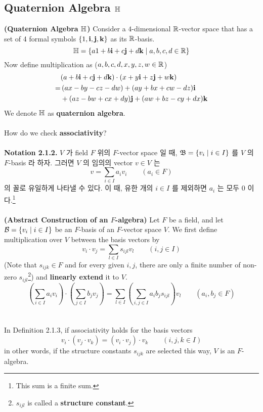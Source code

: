 \subsection{Quaternion Algebra $\mathbb{H}$}
 \textbf{(Quaternion Algebra $\mathbb{H}$)} Consider a $4$-dimensional $\mathbb{R}$-vector space that has a set of 4 formal symbols $\{1, \mathrm{\mathbf{i}}, \mathrm{\mathbf{j}}, \mathrm{\mathbf{k}}\}$ as its $\mathbb{R}$-basis.
$$\mathbb{H} = \{a1+b\mathrm{\mathbf{i}}+c\mathrm{\mathbf{j}} + d\mathrm{\mathbf{k}} \mid a, b, c, d\in \mathbb{R}\}$$
Now define multiplication as ($a, b, c, d, x, y, z, w\in \mathbb{R}$)
$$\begin{aligned}
&(a+b\mathrm{\mathbf{i}}+c\mathrm{\mathbf{j}}+d\mathrm{\mathbf{k}})\cdot(x+y\mathrm{\mathbf{i}}+z\mathrm{\mathbf{j}}+w\mathrm{\mathbf{k}}) \\=&\,(ax-by-cz-dw) + (ay+bx+cw-dz)\mathrm{\mathbf{i}}\\&+(az-bw+cx+dy)\mathrm{\mathbf{j}} + (aw+bz-cy+dx)\mathrm{\mathbf{k}}
\end{aligned}$$
We denote $\mathbb{H}$ as \textbf{quaternion algebra}.\\
\\
How do we check \textbf{associativity}?\\
\\
\textbf{\sffamily Notation 2.1.2.} $V$ 가 field $F$ 위의 $F$-vector space 일 때, $\mathfrak{B} = \{v_i \mid i\in I\}$ 를 $V$ 의 $F$-basis 라 하자. 그러면 $V$ 의 임의의 vector $v\in V$ 는
$$v = \sum_{i\in I} a_i v_i \qquad (a_i\in F)$$
의 꼴로 유일하게 나타낼 수 있다. 이 때, 유한 개의 $i\in I$ 를 제외하면 $a_i$ 는 모두 0 이다.\footnote{This sum is a finite sum.}\\
\\
 \textbf{(Abstract Construction of an $F$-algebra)} Let $F$ be a field, and let $\mathcal{B} = \{v_i\mid i\in I\}$ be an $F$-basis of an $F$-vector space $V$. We first define multiplication over $V$ between the basis vectors by
$$v_i\cdot v_j = \sum_{l\in I} s_{ijl}v_l \qquad (i, j\in I)$$
(Note that $s_{ijk}\in F$ and for every given $i, j$, there are only a finite number of non-zero $s_{ijl}$\footnote{$s_{ijl}$ is called a \textbf{structure constant}.}) and \textbf{linearly extend} it to $V$.
$$\left(\sum_{i\in I} a_iv_i\right)\cdot \left(\sum_{j\in I} b_jv_j\right) = \sum_{l\in I}\left(\sum_{i,j\in I} a_ib_js_{ijl}\right)v_l\qquad (a_i, b_j\in F)$$\\
\\
 In {\sffamily Definition 2.1.3}, if associativity holds for the basis vectors
$$v_i\cdot(v_j\cdot v_k) = (v_i\cdot v_j)\cdot v_k \qquad (i, j, k\in I)$$
in other words, if the structure constants $s_{ijk}$ are selected this way, $V$ is an $F$-algebra.\\
